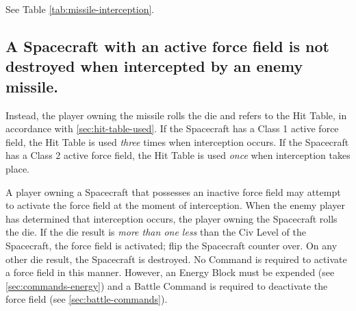 See Table \ref{tab:missile-interception}.


\begin{table}[htbp]
  \centering
\end{table}

\subsection[Missiles And Force Fields]{A Spacecraft with an active
  force field is not destroyed 
  when intercepted by an enemy missile.}
\label{sec:missile-force-field}



Instead, the player owning the missile rolls the die and refers to the
Hit Table, in accordance with \ref{sec:hit-table-used}. If the
Spacecraft has a Class 1 active force field, the Hit Table is used
\emph{three} times when interception occurs. If the Spacecraft has a
Class 2 active force field, the Hit Table is used \emph{once} when
interception takes place.

A player owning a Spacecraft that possesses an inactive force field
may attempt to activate the force field at the moment of interception.
When the enemy player has determined that interception occurs, the
player owning the Spacecraft rolls the die. If the die result is
\emph{more than one less} than the Civ Level of the Spacecraft, the
force field is activated; flip the Spacecraft counter over.  On any
other die result, the Spacecraft is destroyed. No Command is required
to activate a force field in this manner. However, an Energy Block
must be expended (see \ref{sec:commands-energy}) and a Battle Command
is required to deactivate the force field (see
\ref{sec:battle-commands}).

